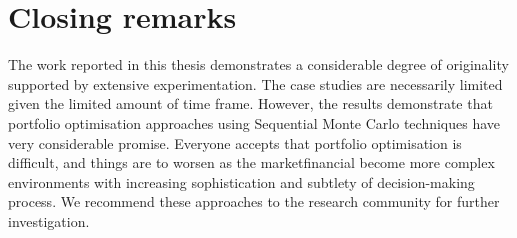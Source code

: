 \section{Closing remarks}
\label{ClosingRemark}
The work reported in this thesis demonstrates a considerable degree of
originality supported by extensive experimentation. The case studies
are necessarily limited given the limited amount of time frame.  However, the results
 demonstrate that portfolio optimisation
approaches using Sequential Monte Carlo techniques have very considerable promise. Everyone accepts that portfolio optimisation is difficult, and things are to worsen as the marketfinancial become more complex environments with increasing sophistication and
subtlety of decision-making process. We recommend these approaches to
the research community for further investigation.





